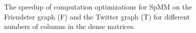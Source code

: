 \begin{figure}
	\begin{center}
		\footnotesize
		
		\caption{The speedup of computation optimizations for SpMM on the Friendster
			graph (F) and the Twitter graph (T) for different numbers of
			columns in the dense matrices.}
		\label{perf:spmm_opt}
	\end{center}
\end{figure}


%		


